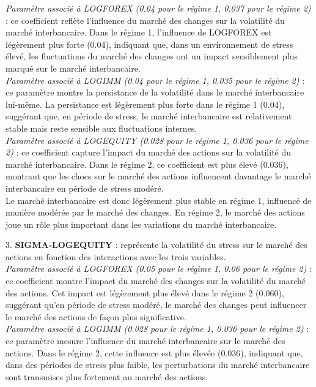 \textit{Paramètre associé à LOGFOREX (0.04 pour le régime 1, 0.037 pour le régime 2)} : ce coefficient reflète l’influence du marché des changes sur la volatilité du marché interbancaire. Dans le régime 1, l’influence de LOGFOREX est légèrement plus forte (0.04), indiquant que, dans un environnement de stress élevé, les fluctuations du marché des changes ont un impact sensiblement plus marqué sur le marché interbancaire.\\

\textit{Paramètre associé à LOGIMM (0.04 pour le régime 1, 0.035 pour le régime 2)} : ce paramètre montre la persistance de la volatilité dans le marché interbancaire lui-même. La persistance est légèrement plus forte dans le régime 1 (0.04), suggérant que, en période de stress, le marché interbancaire est relativement stable mais reste sensible aux fluctuations internes.\\

\textit{Paramètre associé à LOGEQUITY (0.028 pour le régime 1, 0.036 pour le régime 2)} : ce coefficient capture l’impact du marché des actions sur la volatilité du marché interbancaire. Dans le régime 2, ce coefficient est plus élevé (0.036), montrant que les chocs sur le marché des actions influencent davantage le marché interbancaire en période de stress modéré.\\

Le marché interbancaire est donc légèrement plus stable en régime 1, influencé de manière modérée par le marché des changes. En régime 2, le marché des actions joue un rôle plus important dans les variations du marché interbancaire.

\vspace{0.5cm}

3. \textbf{SIGMA-LOGEQUITY} : représente la volatilité du stress sur le marché des actions en fonction des interactions avec les trois variables.\\

\textit{Paramètre associé à LOGFOREX (0.05 pour le régime 1, 0.06 pour le régime 2)} : ce coefficient montre l’impact du marché des changes sur la volatilité du marché des actions. Cet impact est légèrement plus élevé dans le régime 2 (0.060), suggérant qu’en période de stress modéré, le marché des changes peut influencer le marché des actions de façon plus significative.\\

\textit{Paramètre associé à LOGIMM (0.028 pour le régime 1, 0.036 pour le régime 2)} : ce paramètre mesure l’influence du marché interbancaire sur le marché des actions. Dans le régime 2, cette influence est plus élevée (0.036), indiquant que, dans des périodes de stress plus faible, les perturbations du marché interbancaire sont transmises plus fortement au marché des actions.\\

